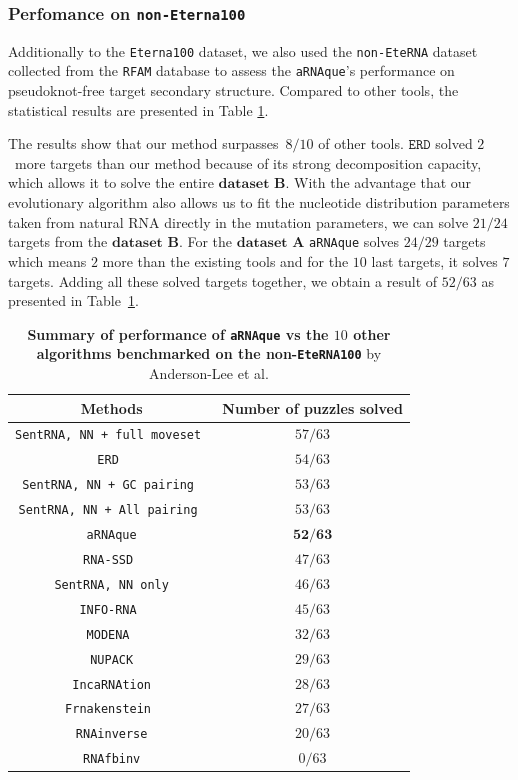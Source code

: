 \subsubsection{Perfomance on \texttt{non-Eterna100}}
Additionally to the \texttt{Eterna100} dataset, we also used the \texttt{non-EteRNA} dataset collected from the \texttt{RFAM} database to assess the \texttt{aRNAque}'s performance on pseudoknot-free target secondary structure. Compared to other tools, the statistical results are presented in Table {\ref{Tab:non-eterna}}. 

The results show that our method surpasses~\(8/10\) of other tools. \(\texttt{ERD}\) solved \(2\)~more targets than our method because of its strong decomposition capacity, which allows it to solve the entire \(\textbf{dataset B}\). With the advantage that our evolutionary algorithm also allows us to fit the nucleotide distribution parameters taken from natural RNA directly in the mutation parameters, we can solve \(21/24\) targets from the \(\textbf{dataset B}\). For the \(\textbf{dataset A}\) \texttt{aRNAque} solves \(24/29\) targets which means \(2\) more than the existing tools and for the \(10\) last targets, it solves \(7\) targets. Adding all these solved targets together, we obtain a result of \(52/63\) as presented in Table~{\ref{Tab:non-eterna}}.
\begin{center}
	\begin{table}[t!]
		\caption{{\textbf{Summary of performance of \texttt{aRNAque} vs the $10$ other algorithms benchmarked on the non-\texttt{EteRNA100}} by Anderson-Lee et al. \cite{anderson2016principles} }} \label{Tab:non-eterna}
		\centering
		\begin{tabular}[t!]{|c|c|}
			\hline
			\textbf{Methods}& Number of puzzles solved\\
			\hline
			\texttt{SentRNA, NN + full moveset }&$57/63$\\
			\hline
			\texttt{ERD }&$54/63$\\
			\hline
			\texttt{SentRNA, NN + GC pairing }&$53/63$\\
			\hline
			\texttt{SentRNA, NN + All pairing }&$53/63$\\
			\hline
			\texttt{aRNAque}&$\textbf{52/63}$\\
			\hline
			\texttt{RNA-SSD }&$47/63$\\
			\hline
			\texttt{SentRNA, NN only}&$46/63$\\
			\hline
			\texttt{INFO-RNA }&$45/63$\\
			\hline
			\texttt{MODENA }&$32/63$\\
			\hline
			\texttt{NUPACK}&$29/63$\\
			\hline
			\texttt{IncaRNAtion}&$28/63$\\
			\hline
			\texttt{Frnakenstein }&$27/63$\\
			\hline
			\texttt{RNAinverse}&$20/63$\\
			\hline
			\texttt{RNAfbinv}&$0/63$\\
			\hline
		\end{tabular}
	\end{table}
\end{center}
